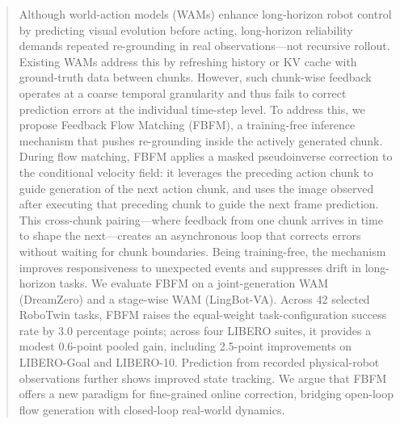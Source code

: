 

\begin{abstract}
Although world-action models (WAMs) enhance long-horizon robot control by
predicting visual evolution before acting, long-horizon reliability demands
repeated re-grounding in real observations---not recursive rollout. Existing WAMs
address this by refreshing history or KV cache with ground-truth data between
chunks. However, such chunk-wise feedback operates at a coarse temporal
granularity and thus fails to correct prediction errors at the individual
time-step level. To address this, we propose Feedback Flow Matching (FBFM), a
training-free inference mechanism that pushes re-grounding inside the actively
generated chunk. During flow matching, FBFM applies a masked pseudoinverse
correction to the conditional velocity field: it leverages the preceding action
chunk to guide generation of the next action chunk, and uses the image observed
after executing that preceding chunk to guide the next frame prediction. This
cross-chunk pairing---where feedback from one chunk arrives in time to shape the
next---creates an asynchronous loop that corrects errors without waiting for
chunk boundaries. Being training-free, the mechanism improves responsiveness to
unexpected events and suppresses drift in long-horizon tasks. We evaluate FBFM
on a joint-generation WAM (DreamZero) and a stage-wise WAM (LingBot-VA). Across
42 selected RoboTwin tasks, FBFM raises the equal-weight task-configuration
success rate by 3.0 percentage points; across four LIBERO suites, it provides a
modest 0.6-point pooled gain, including 2.5-point improvements on LIBERO-Goal
and LIBERO-10. Prediction from recorded physical-robot observations further
shows improved state tracking. We argue that FBFM offers a new paradigm for
fine-grained online correction, bridging open-loop flow generation with
closed-loop real-world dynamics.
\end{abstract}
